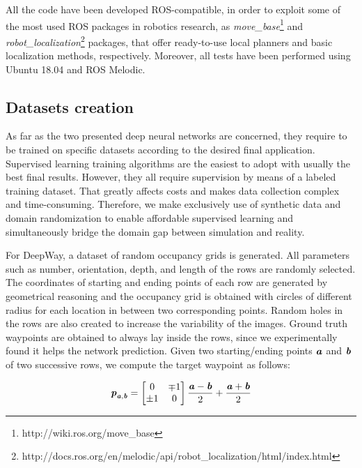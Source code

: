 \documentclass[journal]{IEEEtran}
\begin{document}
 All the code have been developed ROS-compatible, in order to exploit some of the most used ROS packages in robotics research, as \textit{move\_base}\footnote{http://wiki.ros.org/move\_base} and \textit{robot\_localization}\footnote{http://docs.ros.org/en/melodic/api/robot\_localization/html/index.html} packages, that offer ready-to-use local planners and basic localization methods, respectively. Moreover, all tests have been performed using Ubuntu 18.04 and ROS Melodic.
\vspace{-7pt}
\subsection{Datasets creation}
As far as the two presented deep neural networks are concerned, they require to be trained on specific datasets according to the desired final application. Supervised learning training algorithms are the easiest to adopt with usually the best final results. However, they all require supervision by means of a labeled training dataset. That greatly affects costs and makes data collection complex and time-consuming. Therefore, we make exclusively use of synthetic data and domain randomization \cite{tobin2017domain} to enable affordable supervised learning and simultaneously bridge the domain gap between simulation and reality.

For DeepWay, a dataset of random occupancy grids is generated. All parameters such as number, orientation, depth, and length of the rows are randomly selected. The coordinates of starting and ending points of each row are generated by geometrical reasoning and the occupancy grid is obtained with circles of different radius for each location in between two corresponding points. Random holes in the rows are also created to increase the variability of the images. Ground truth waypoints are obtained to always lay inside the rows, since we experimentally found it helps the network prediction. Given two starting/ending points $\textbf{\textit{a}}$ and $\textbf{\textit{b}}$ of two successive rows, we compute the target waypoint as follows:

\begin{equation}
    \textbf{\textit{p}}_{\textbf{\textit{a}},\textbf{\textit{b}}} = \begin{bmatrix} 0 & \mp1 \\
                              \pm 1 & 0 \end{bmatrix}
              \frac{\textbf{\textit{a}}-\textbf{\textit{b}}}{2} + \frac{\textbf{\textit{a}}+\textbf{\textit{b}}}{2}
\end{equation}
\end{document}
